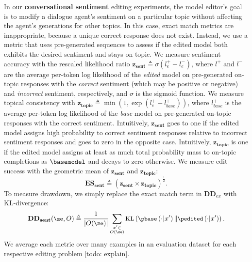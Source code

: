 In our \textbf{conversational sentiment} editing experiments, the model editor's goal is to modify a dialogue agent's sentiment on a particular topic without affecting the agent's generations for other topics. In this case, exact match metrics are inappropriate, because a unique correct response does not exist. Instead, we use a metric that uses pre-generated sequences 
to assess if the edited model both exhibits the desired sentiment and stays on topic. 
We measure sentiment accuracy with the rescaled likelihood ratio $\mathbf{z_{sent}} \triangleq \sigma(l_e^+ - l_e^-)$, where $l^+$ and $l^-$ are the average per-token log likelihood of the \textit{edited} model on pre-generated on-topic responses with the \textit{correct} sentiment (which may be positive or negative) and \textit{incorrect} sentiment, respectively, and $\sigma$ is the sigmoid function. We measure topical consistency with $\mathbf{z_{topic}} \triangleq \min\left(1, \exp(l_e^+ - l_{base}^+)\right)$, where $l_{base}^+$ is the average per-token log likelihood of the \textit{base} model on pre-generated on-topic responses with the correct sentiment. Intuitively, $\mathbf{z_{sent}}$ goes to one if the edited model assigns high probability to correct sentiment responses relative to incorrect sentiment responses and goes to zero in the opposite case. Intuitively, $\mathbf{z_{topic}}$ is one if the edited model assigns at least as much total probability mass to on-topic completions as $\basemodel$ and decays to zero otherwise. We measure edit success with the geometric mean of $\mathbf{z_{sent}}$ and $\mathbf{z_{topic}}$:
\begin{equation}
    \mathbf{ES_{sent}} \triangleq \left(\mathbf{z_{sent}} \times \mathbf{z_{topic}}\right)^{\frac{1}{2}}.
\end{equation}
To measure drawdown, we simply replace the exact match term in $\mathbf{DD}_{ex}$ with KL-divergence:
\begin{equation}
    \small
    \mathbf{DD_{sent}}(\ze,O) \triangleq \frac{1}{|O(\ze)|}\sum_{\substack{x' \in\\  O(\ze)}} \text{KL}\left(\pbase\left(\cdot|x'\right) \| \pedited\left(\cdot|x'\right)\right).
\end{equation}
We average each metric over many examples in an evaluation dataset for each respective editing problem [todo: explain].

